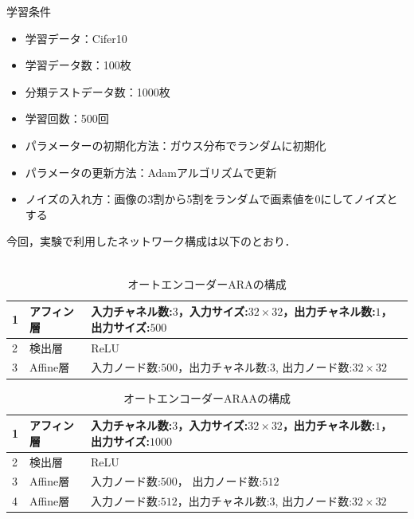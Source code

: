 \documentclass[12pt]{jsarticle}
\begin{document}
学習条件
\begin{itemize}
  \item 学習データ：Cifer10
  \item 学習データ数：100枚
  \item 分類テストデータ数：1000枚
  \item 学習回数：500回
  \item パラメーターの初期化方法：ガウス分布でランダムに初期化
  \item パラメータの更新方法：Adamアルゴリズムで更新
  \item ノイズの入れ方：画像の3割から5割をランダムで画素値を0にしてノイズとする
\end{itemize}

今回，実験で利用したネットワーク構成は以下のとおり．\\\\

\begin{table}[ht]
\begin{center}
\caption{オートエンコーダーARAの構成}
\label{table:AE:ARA}
\begin{tabularx}{0.9\linewidth}{|l|l|X|}
\hline
1 & アフィン層 & 入力チャネル数:$3$，入力サイズ:$32 \times 32$，出力チャネル数:$1$，出力サイズ:$500 $ \\
\hline
2 & 検出層 & ReLU \\
\hline
3 & Affine層 & 入力ノード数:$500$，出力チャネル数:$3$, 出力ノード数:$ 32 \times 32 $ \\
\hline
\end{tabularx}
\end{center}
\end{table}

\begin{table}[ht]
\begin{center}
\caption{オートエンコーダーARAAの構成}
\label{table:AE:ARAA}
\begin{tabularx}{0.9\linewidth}{|l|l|X|}
\hline
1 & アフィン層 & 入力チャネル数:$3$，入力サイズ:$32 \times 32$，出力チャネル数:$1$，出力サイズ:$1000 $ \\
\hline
2 & 検出層 & ReLU \\
\hline
3 & Affine層 & 入力ノード数:$500$， 出力ノード数:$ 512 $ \\
\hline
4 & Affine層 & 入力ノード数:$512$，出力チャネル数:$3$, 出力ノード数:$ 32 \times 32 $ \\
\hline
\end{tabularx}
\end{center}
\end{table}
\end{document}
